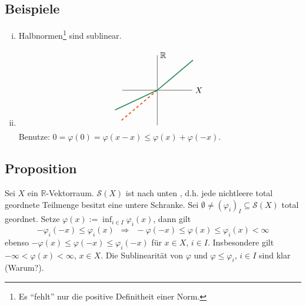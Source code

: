 \subsection[Beispiele für sublineare Abbildungen]{Beispiele} %
\label{sub:218}
\begin{enumerate}[(i)]
	\item Halbnormen\footnote{Es \enquote{fehlt} nur die positive Definitheit einer Norm.} sind sublinear.
	\item \[
		\begin{tikzpicture}[scale=0.5]
			\draw (-3,0) -- (3,0) node[right]{$X$};
			\draw (0,-3) -- (0,3) node[right]{$\mathds{R}$};
			\draw[very thick, dashed,OrangeRed2] (0,0) -- (220:4);
			\draw[very thick,SeaGreen4] (40:4) -- (0,0) -- (205:4);
		\end{tikzpicture}
	\]
	Benutze: $0 = \varphi(0) = \varphi(x-x) \le \varphi(x) + \varphi(-x)$.
\end{enumerate}

\subsection[Proposition: Die sublinearen Abbildungen $\mathcal{S}(X)$ sind nach unten induktiv geordnet]{Proposition} %
\label{sub:219}
Sei $X$ ein $\mathds{R}$-Vektorraum. $\mathcal{S}(X)$ ist nach unten , d.h. jede nichtleere total geordnete Teilmenge besitzt eine untere Schranke.
Sei $\emptyset \not= (\varphi_i)_{I} \subseteq \mathcal{S}(X)$ total geordnet. Setze $\varphi(x) := \inf_{i \in I} \varphi_i(x)$, dann gilt 
\[
	- \varphi_i(-x) \le \varphi_i(x) \enspace\Longrightarrow \enspace- \varphi(-x) \le \varphi(x) \le \varphi_i(x) < \infty
\]
ebenso $-\varphi(x) \le \varphi(-x) \le \varphi_i(-x)$ für $x \in X$, $i \in I$. Insbesondere gilt $- \infty <  \varphi(x) < \infty$, $x \in X$. 
Die Sublinearität von $\varphi$ und $\varphi \le \varphi_i$, $i \in I$ sind klar (Warum?). \bewende

